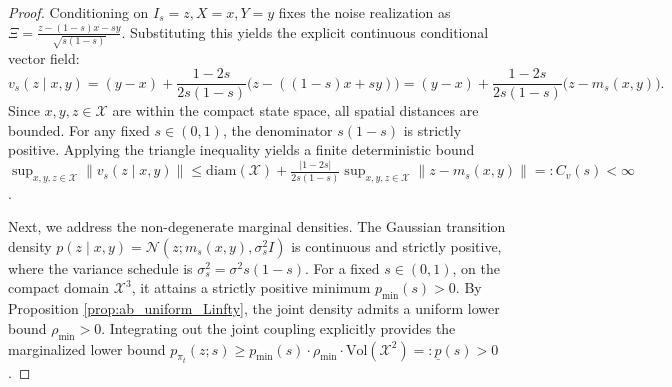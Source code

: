 \documentclass[11pt]{article}
\theoremstyle{definition}
\numberwithin{equation}{section}%
\begin{document}
{\begin{proof}
Conditioning on $I_s = z, X=x, Y=y$ fixes the noise realization as $\Xi = \frac{z - (1-s)x - sy}{\sqrt{s(1-s)}}$. Substituting this yields the explicit continuous conditional vector field:
\begin{equation*}
    v_s(z \mid x,y) = (y - x) + \frac{1-2s}{2s(1-s)} \big(z - ((1-s)x + sy)\big) = (y - x) + \frac{1-2s}{2s(1-s)} \big(z - m_s(x, y)\big).
\end{equation*}
Since $x, y, z \in \mathcal{X}$ are within the compact state space, all spatial distances are bounded. For any fixed $s \in (0,1)$, the denominator $s(1-s)$ is strictly positive. Applying the triangle inequality yields a finite deterministic bound $\sup_{x,y,z \in \mathcal{X}} \|v_s(z \mid x,y)\| \le \mathrm{diam}(\mathcal{X}) + \frac{|1-2s|}{2s(1-s)} \sup_{x,y,z \in \mathcal{X}} \|z - m_s(x,y)\| =: C_v(s) < \infty$.

Next, we address the non-degenerate marginal densities. The Gaussian transition density $p(z \mid x,y) = \mathcal{N}(z ; m_s(x,y), \sigma_s^2 I)$ is continuous and strictly positive, where the variance schedule is $\sigma_s^2 = \sigma^2 s(1-s)$. For a fixed $s \in (0,1)$, on the compact domain $\mathcal{X}^3$, it attains a strictly positive minimum $p_{\min}(s) > 0$. By Proposition \ref{prop:ab_uniform_Linfty}, the joint density admits a uniform lower bound $\rho_{\min} > 0$. Integrating out the joint coupling explicitly provides the marginalized lower bound $p_{\pi_t}(z; s) \ge p_{\min}(s) \cdot \rho_{\min} \cdot \mathrm{Vol}(\mathcal{X}^2) =: \underline{p}(s) > 0$.
\end{proof}


}
\end{document}

